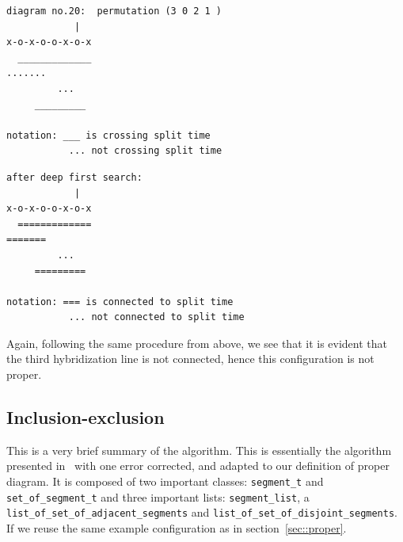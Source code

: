 \documentclass[10pt,letter]{article}
\begin{document}
\noindent\begin{minipage}[t]{.5\textwidth}
\begin{bashInput3}
\begin{lstlisting}[style=BashInputStyle]
diagram no.20:  permutation (3 0 2 1 )
            |    
x-o-x-o-o-x-o-x
  _____________ 
.......         
         ...     
     _________   

notation: ___ is crossing split time
           ... not crossing split time
\end{lstlisting}   
\end{bashInput3}
\end{minipage}\hfill
\begin{minipage}[t]{.5\textwidth}
\begin{bashInput3}
\begin{lstlisting}[style=BashInputStyle]
after deep first search:
            |    
x-o-x-o-o-x-o-x
  ============= 
=======         
         ...     
     =========   

notation: === is connected to split time
           ... not connected to split time
\end{lstlisting}   
\end{bashInput3}
\end{minipage}
Again, following the same procedure from above, we see that it is evident that the third hybridization line is not connected, hence this configuration is not proper.



\subsection{Inclusion-exclusion}
\label{sec::inclu}

This is a very brief summary of the algorithm. This is essentially the algorithm presented in~\cite{boag_inclusion-exclusion_2018} with one error corrected, and adapted to our definition of proper diagram. It is composed of two important classes: \Verb#segment_t# and \Verb#set_of_segment_t# and three important lists: \Verb#segment_list#, a \Verb#list_of_set_of_adjacent_segments# and \Verb#list_of_set_of_disjoint_segments#. If we reuse the same example configuration as in section~\ref{sec::proper}.
\end{document}
